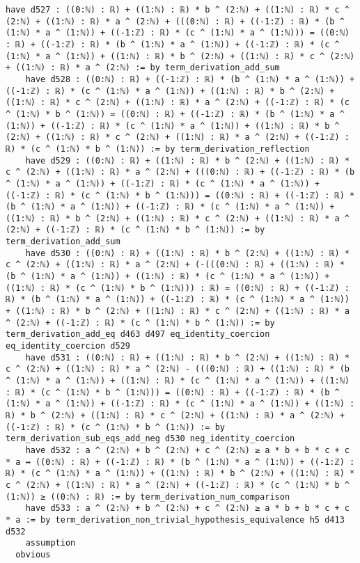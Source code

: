 \documentclass{article}
\begin{document}
\begin{tcolorbox}[colback=white!10, width=\linewidth]
\begin{lstlisting}[language=Lean4]
    have d527 : ((0:ℕ) : ℝ) + ((1:ℕ) : ℝ) * b ^ (2:ℕ) + ((1:ℕ) : ℝ) * c ^ (2:ℕ) + ((1:ℕ) : ℝ) * a ^ (2:ℕ) + (((0:ℕ) : ℝ) + ((-1:ℤ) : ℝ) * (b ^ (1:ℕ) * a ^ (1:ℕ)) + ((-1:ℤ) : ℝ) * (c ^ (1:ℕ) * a ^ (1:ℕ))) = ((0:ℕ) : ℝ) + ((-1:ℤ) : ℝ) * (b ^ (1:ℕ) * a ^ (1:ℕ)) + ((-1:ℤ) : ℝ) * (c ^ (1:ℕ) * a ^ (1:ℕ)) + ((1:ℕ) : ℝ) * b ^ (2:ℕ) + ((1:ℕ) : ℝ) * c ^ (2:ℕ) + ((1:ℕ) : ℝ) * a ^ (2:ℕ) := by term_derivation_add_sum
    have d528 : ((0:ℕ) : ℝ) + ((-1:ℤ) : ℝ) * (b ^ (1:ℕ) * a ^ (1:ℕ)) + ((-1:ℤ) : ℝ) * (c ^ (1:ℕ) * a ^ (1:ℕ)) + ((1:ℕ) : ℝ) * b ^ (2:ℕ) + ((1:ℕ) : ℝ) * c ^ (2:ℕ) + ((1:ℕ) : ℝ) * a ^ (2:ℕ) + ((-1:ℤ) : ℝ) * (c ^ (1:ℕ) * b ^ (1:ℕ)) = ((0:ℕ) : ℝ) + ((-1:ℤ) : ℝ) * (b ^ (1:ℕ) * a ^ (1:ℕ)) + ((-1:ℤ) : ℝ) * (c ^ (1:ℕ) * a ^ (1:ℕ)) + ((1:ℕ) : ℝ) * b ^ (2:ℕ) + ((1:ℕ) : ℝ) * c ^ (2:ℕ) + ((1:ℕ) : ℝ) * a ^ (2:ℕ) + ((-1:ℤ) : ℝ) * (c ^ (1:ℕ) * b ^ (1:ℕ)) := by term_derivation_reflection
    have d529 : ((0:ℕ) : ℝ) + ((1:ℕ) : ℝ) * b ^ (2:ℕ) + ((1:ℕ) : ℝ) * c ^ (2:ℕ) + ((1:ℕ) : ℝ) * a ^ (2:ℕ) + (((0:ℕ) : ℝ) + ((-1:ℤ) : ℝ) * (b ^ (1:ℕ) * a ^ (1:ℕ)) + ((-1:ℤ) : ℝ) * (c ^ (1:ℕ) * a ^ (1:ℕ)) + ((-1:ℤ) : ℝ) * (c ^ (1:ℕ) * b ^ (1:ℕ))) = ((0:ℕ) : ℝ) + ((-1:ℤ) : ℝ) * (b ^ (1:ℕ) * a ^ (1:ℕ)) + ((-1:ℤ) : ℝ) * (c ^ (1:ℕ) * a ^ (1:ℕ)) + ((1:ℕ) : ℝ) * b ^ (2:ℕ) + ((1:ℕ) : ℝ) * c ^ (2:ℕ) + ((1:ℕ) : ℝ) * a ^ (2:ℕ) + ((-1:ℤ) : ℝ) * (c ^ (1:ℕ) * b ^ (1:ℕ)) := by term_derivation_add_sum
    have d530 : ((0:ℕ) : ℝ) + ((1:ℕ) : ℝ) * b ^ (2:ℕ) + ((1:ℕ) : ℝ) * c ^ (2:ℕ) + ((1:ℕ) : ℝ) * a ^ (2:ℕ) + (-(((0:ℕ) : ℝ) + ((1:ℕ) : ℝ) * (b ^ (1:ℕ) * a ^ (1:ℕ)) + ((1:ℕ) : ℝ) * (c ^ (1:ℕ) * a ^ (1:ℕ)) + ((1:ℕ) : ℝ) * (c ^ (1:ℕ) * b ^ (1:ℕ))) : ℝ) = ((0:ℕ) : ℝ) + ((-1:ℤ) : ℝ) * (b ^ (1:ℕ) * a ^ (1:ℕ)) + ((-1:ℤ) : ℝ) * (c ^ (1:ℕ) * a ^ (1:ℕ)) + ((1:ℕ) : ℝ) * b ^ (2:ℕ) + ((1:ℕ) : ℝ) * c ^ (2:ℕ) + ((1:ℕ) : ℝ) * a ^ (2:ℕ) + ((-1:ℤ) : ℝ) * (c ^ (1:ℕ) * b ^ (1:ℕ)) := by term_derivation_add_eq d463 d497 eq_identity_coercion eq_identity_coercion d529
    have d531 : ((0:ℕ) : ℝ) + ((1:ℕ) : ℝ) * b ^ (2:ℕ) + ((1:ℕ) : ℝ) * c ^ (2:ℕ) + ((1:ℕ) : ℝ) * a ^ (2:ℕ) - (((0:ℕ) : ℝ) + ((1:ℕ) : ℝ) * (b ^ (1:ℕ) * a ^ (1:ℕ)) + ((1:ℕ) : ℝ) * (c ^ (1:ℕ) * a ^ (1:ℕ)) + ((1:ℕ) : ℝ) * (c ^ (1:ℕ) * b ^ (1:ℕ))) = ((0:ℕ) : ℝ) + ((-1:ℤ) : ℝ) * (b ^ (1:ℕ) * a ^ (1:ℕ)) + ((-1:ℤ) : ℝ) * (c ^ (1:ℕ) * a ^ (1:ℕ)) + ((1:ℕ) : ℝ) * b ^ (2:ℕ) + ((1:ℕ) : ℝ) * c ^ (2:ℕ) + ((1:ℕ) : ℝ) * a ^ (2:ℕ) + ((-1:ℤ) : ℝ) * (c ^ (1:ℕ) * b ^ (1:ℕ)) := by term_derivation_sub_eqs_add_neg d530 neg_identity_coercion
    have d532 : a ^ (2:ℕ) + b ^ (2:ℕ) + c ^ (2:ℕ) ≥ a * b + b * c + c * a ↔ ((0:ℕ) : ℝ) + ((-1:ℤ) : ℝ) * (b ^ (1:ℕ) * a ^ (1:ℕ)) + ((-1:ℤ) : ℝ) * (c ^ (1:ℕ) * a ^ (1:ℕ)) + ((1:ℕ) : ℝ) * b ^ (2:ℕ) + ((1:ℕ) : ℝ) * c ^ (2:ℕ) + ((1:ℕ) : ℝ) * a ^ (2:ℕ) + ((-1:ℤ) : ℝ) * (c ^ (1:ℕ) * b ^ (1:ℕ)) ≥ ((0:ℕ) : ℝ) := by term_derivation_num_comparison
    have d533 : a ^ (2:ℕ) + b ^ (2:ℕ) + c ^ (2:ℕ) ≥ a * b + b * c + c * a := by term_derivation_non_trivial_hypothesis_equivalence h5 d413 d532
    assumption
  obvious

\end{lstlisting}
\end{tcolorbox}
\end{document}
